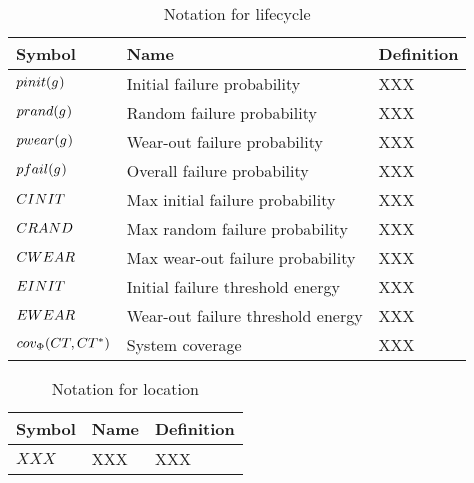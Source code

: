 \begin{table}[pos=htp]
	\begin{tabular}{|p{}|p{}|p{}|}
		\hline
		Symbol & Name & Definition \\
		\hline
		$\functionProbabilityInit{}{}$ & Initial failure probability & XXX \\
		$\functionProbabilityRand{}{}$ & Random failure probability & XXX \\
		$\functionProbabilityWear{}{}$ & Wear-out failure probability & XXX \\
		$\functionProbabilityFail{}{}$ & Overall failure probability & XXX \\
		${C}{INIT}^{}$ & Max initial failure probability & XXX \\
		${C}{RAND}^{}$ & Max random failure probability & XXX \\
		${C}{WEAR}^{}$ & Max wear-out failure probability & XXX \\
		${E}{INIT}^{}$ & Initial failure threshold energy & XXX \\
		${E}{WEAR}^{}$ & Wear-out failure threshold energy & XXX \\
		$\functionSystemCoverage{}{}$ & System coverage & XXX \\
		\hline
	\end{tabular}
	\caption{Notation for lifecycle}
\end{table}

\begin{table}[pos=htp]
	\begin{tabular}{|p{}|p{}|p{}|}
		\hline
		Symbol & Name & Definition \\
		\hline
		$XXX$ & XXX & XXX \\
		\hline
	\end{tabular}
	\caption{Notation for location}
\end{table}